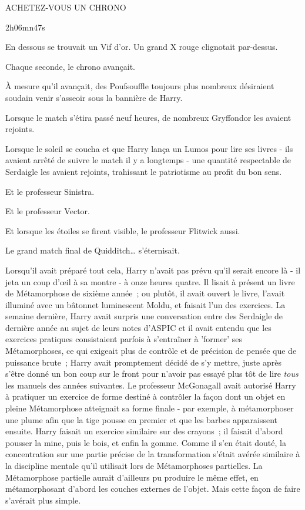 \begin{center}
ACHETEZ-VOUS UN CHRONO

2h06mn47s
\end{center}

En dessous se trouvait un Vif d'or. Un grand X rouge clignotait par-dessus.

\later

Chaque seconde, le chrono avançait.

À mesure qu'il avançait, des Poufsouffle toujours plus nombreux désiraient soudain venir s'asseoir sous la bannière de Harry.

Lorsque le match s'étira passé neuf heures, de nombreux Gryffondor les avaient rejoints.

Lorsque le soleil se coucha et que Harry lança un Lumos pour lire ses livres - ils avaient arrêté de suivre le match il y a longtemps - une quantité respectable de Serdaigle les avaient rejoints, trahissant le patriotisme au profit du bon sens.

Et le professeur Sinistra.

Et le professeur Vector.

Et lorsque les étoiles se firent visible, le professeur Flitwick aussi.

Le grand match final de Quidditch… s'éternisait.

\later

Lorsqu'il avait préparé tout cela, Harry n'avait pas prévu qu'il serait encore là - il jeta un coup d'œil à sa montre - à onze heures quatre. Il lisait à présent un livre de Métamorphose de sixième année~; ou plutôt, il avait ouvert le livre, l'avait illuminé avec un bâtonnet luminescent Moldu, et faisait l'un des exercices. La semaine dernière, Harry avait surpris une conversation entre des Serdaigle de dernière année au sujet de leurs notes d'ASPIC et il avait entendu que les exercices pratiques consistaient parfois à s'entraîner à 'former' ses Métamorphoses, ce qui exigeait plus de contrôle et de précision de pensée que de puissance brute~; Harry avait promptement décidé de s'y mettre, juste après s'être donné un bon coup sur le front pour n'avoir pas essayé plus tôt de lire \emph{tous} les manuels des années suivantes. Le professeur McGonagall avait autorisé Harry à pratiquer un exercice de forme destiné à contrôler la façon dont un objet en pleine Métamorphose atteignait sa forme finale - par exemple, à métamorphoser une plume afin que la tige pousse en premier et que les barbes apparaissent ensuite. Harry faisait un exercice similaire sur des crayons~; il faisait d'abord pousser la mine, puis le bois, et enfin la gomme. Comme il s'en était douté, la concentration sur une partie précise de la transformation s'était avérée similaire à la discipline mentale qu'il utilisait lors de Métamorphoses partielles. La Métamorphose partielle aurait d'ailleurs pu produire le même effet, en métamorphosant d'abord les couches externes de l'objet. Mais cette façon de faire s'avérait plus simple.

